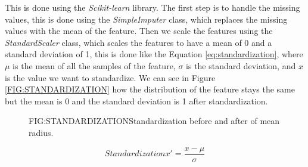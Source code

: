 This is done using the \textit{Scikit-learn} library. The first step is to handle the missing values, this is done using the \textit{SimpleImputer} class, which replaces the missing values with the mean of the feature. Then we scale the features using the \textit{StandardScaler} class, which scales the features to have a mean of 0 and a standard deviation of 1, this is done like the Equation \ref{eq:standardization}, where $\mu$ is the mean of all the samples of the feature, $\sigma$ is the standard deviation, and $x$ is the value we want to standardize. We can see in Figure \ref{FIG:STANDARDIZATION} how the distribution of the feature stays the same but the mean is 0 and the standard deviation is 1 after standardization.

\begin{figure}[Standardization]{FIG:STANDARDIZATION}{Standardization before and after of mean radius.}
\end{figure}

\begin{equation}[eq:standardization]{Standardization}
    \boxed{x' = \frac{x - \mu}{\sigma}}
\end{equation}

